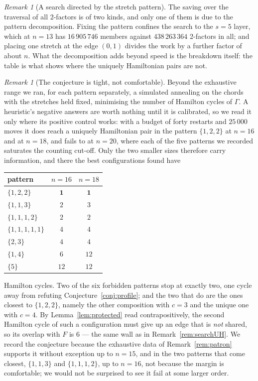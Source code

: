 \documentclass[11pt,a4paper]{article}
\theoremstyle{definition}
\theoremstyle{remark}
\newtheorem{remark}[theorem]{Remark}
\begin{document}
\begin{remark}[A search directed by the stretch pattern]
The saving over the traversal of all 2-factors is of two kinds, and only one of them is due to the pattern decomposition. Fixing the pattern confines the search to the $s=5$ layer, which at $n=13$ has $16\,905\,746$ members against $438\,263\,364$ 2-factors in all; and placing one stretch at the edge $(0,1)$ divides the work by a further factor of about $n$. What the decomposition adds beyond speed is the breakdown itself: the table is what shows where the uniquely Hamiltonian pairs are not.
\end{remark}

\begin{remark}[The conjecture is tight, not comfortable]\label{rem:tight}
Beyond the exhaustive range we ran, for each pattern separately, a simulated annealing on the chords with the stretches held fixed, minimising the number of Hamilton cycles of $\Gamma$. A heuristic's negative answers are worth nothing until it is calibrated, so we read it only where its positive control works: with a budget of forty restarts and $25\,000$ moves it does reach a uniquely Hamiltonian pair in the pattern $\{1,2,2\}$ at $n=16$ and at $n=18$, and fails to at $n=20$, where each of the five patterns we recorded saturates the counting cut-off. Only the two smaller sizes therefore carry information, and there the best configurations found have
\begin{center}
\begin{tabular}{lcc}
\toprule
pattern & $n=16$ & $n=18$\\
\midrule
$\{1,2,2\}$      & $\mathbf{1}$ & $\mathbf{1}$\\
$\{1,1,3\}$      & $2$  & $3$ \\
$\{1,1,1,2\}$    & $2$  & $2$ \\
$\{1,1,1,1,1\}$  & $4$  & $4$ \\
$\{2,3\}$        & $4$  & $4$ \\
$\{1,4\}$        & $6$  & $12$\\
$\{5\}$          & $12$ & $12$\\
\bottomrule
\end{tabular}
\end{center}
Hamilton cycles. Two of the six forbidden patterns stop at exactly two, one cycle away from refuting Conjecture~\ref{conj:profile}; and the two that do are the ones closest to $\{1,2,2\}$, namely the other composition with $c=3$ and the unique one with $c=4$. By Lemma~\ref{lem:protected} read contrapositively, the second Hamilton cycle of such a configuration must give up an edge that is \emph{not} shared, so its overlap with $F$ is $6$ --- the same wall as in Remark~\ref{rem:searchUH}. We record the conjecture because the exhaustive data of Remark~\ref{rem:patron} supports it without exception up to $n=15$, and in the two patterns that come closest, $\{1,1,3\}$ and $\{1,1,1,2\}$, up to $n=16$, not because the margin is comfortable; we would not be surprised to see it fail at some larger order.
\end{remark}
\end{document}
